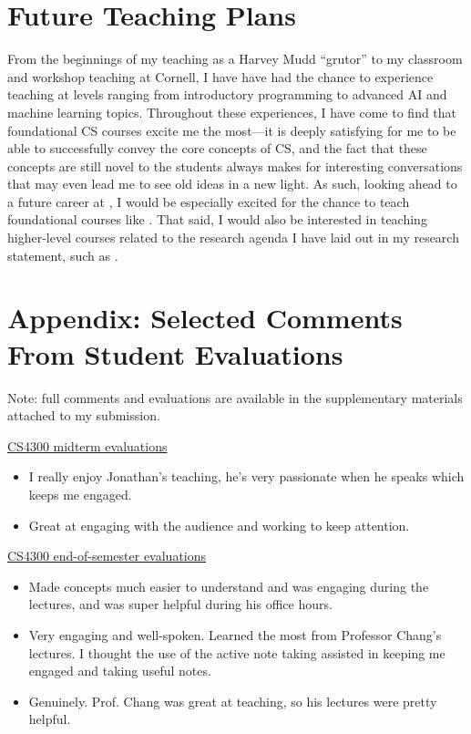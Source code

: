\documentclass[12pt,letterpaper]{article}
\newcommand\closingsent\lateachingend
\newcommand\closingsent\genteachingend
\newcommand{\appendixpreamble}{in the supplementary materials attached to my submission.}
\newcommand{\appendixpreamble}{by request.}
\begin{document}
\section{Future Teaching Plans}
From the beginnings of my teaching as a Harvey Mudd ``grutor'' to my classroom and workshop teaching at Cornell, I have have had the chance to experience teaching at levels ranging from introductory programming to advanced AI and machine learning topics.
Throughout these experiences, I have come to find that foundational CS courses excite me the most---it is deeply satisfying for me to be able to successfully convey the core concepts of CS, and the fact that these concepts are still novel to the students always makes for interesting conversations that may even lead me to see old ideas in a new light.
As such, looking ahead to a future career at \schoolname, I would be especially excited for the chance to teach foundational courses like \schoolintrocourses.
That said, I would also be interested in teaching higher-level courses related to the research agenda I have laid out in my research statement, such as \schooladvcourses.
\closingsent

\ifappendix
\vspace{\baselineskip}
\section{Appendix: Selected Comments From Student Evaluations}
Note: full comments and evaluations are available \appendixpreamble


\noindent\underline{CS4300 midterm evaluations}
\begin{itemize}
    \item I really enjoy Jonathan's teaching, he's very passionate when he speaks which keeps me engaged.
    \item Great at engaging with the audience and working to keep attention.
\end{itemize}

\noindent\underline{CS4300 end-of-semester evaluations}
\begin{itemize}
    \item Made concepts much easier to understand and was engaging during the lectures, and was super helpful during his office hours.
    \item Very engaging and well-spoken. Learned the most from Professor Chang's lectures. I thought the use of the active note taking assisted in keeping me engaged and taking useful notes.
    \item Genuinely. Prof. Chang was great at teaching, so his lectures were pretty helpful.
\end{itemize}
\end{document}
